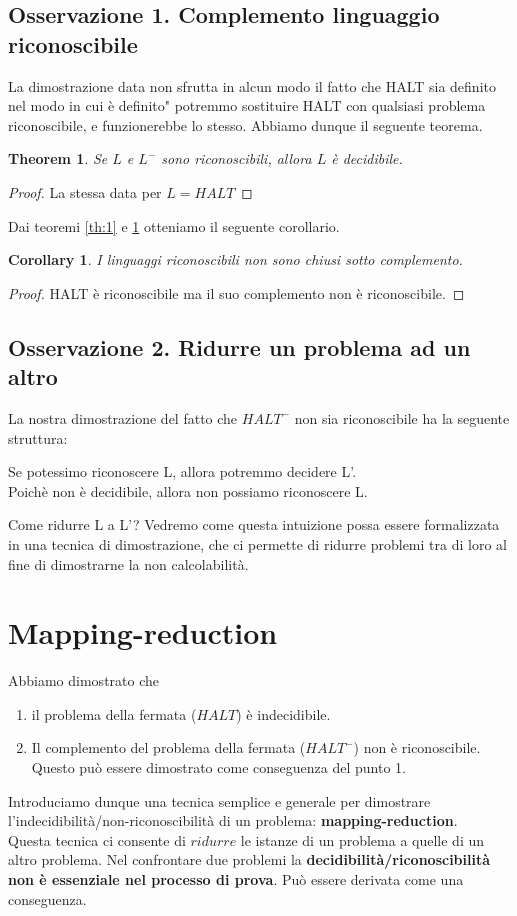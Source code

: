 \documentclass[a4paper, 12pt]{article}
\newtheorem{theorem}{Theorem}[section]
\newtheorem{corollary}{Corollary}[theorem]
\begin{document}
\subsection{Osservazione 1. Complemento linguaggio riconoscibile}
La dimostrazione data non sfrutta in alcun modo il fatto che HALT sia definito nel modo in cui \`e definito" potremmo sostituire HALT con qualsiasi problema riconoscibile, e funzionerebbe lo stesso. Abbiamo dunque il seguente teorema.
\begin{theorem}
\label{th:2}
Se $L$ e $L^{-}$ sono riconoscibili, allora $L$ \`e decidibile.
\end{theorem}
\begin{proof}
La stessa data per $L = HALT$
\end{proof}
Dai teoremi \ref{th:1} e \ref{th:2} otteniamo il seguente corollario.
\begin{corollary}
I linguaggi riconoscibili non sono chiusi sotto complemento.
\end{corollary}
\begin{proof}
HALT \`e riconoscibile ma il suo complemento non \`e riconoscibile.
\end{proof}
\subsection{Osservazione 2. Ridurre un problema ad un altro}
La nostra dimostrazione del fatto che $HALT^{-}$ non sia riconoscibile ha la seguente struttura:
\begin{center}
Se potessimo riconoscere L, allora potremmo decidere L'.\\ Poich\`e non \`e decidibile, allora non possiamo riconoscere L.
\end{center}
Come ridurre L a L'? Vedremo come questa intuizione possa essere formalizzata in una tecnica di dimostrazione, che ci permette di ridurre problemi tra di loro al fine di dimostrarne la non calcolabilit\`a.
\newpage
\section{Mapping-reduction}
Abbiamo dimostrato che 
\begin{enumerate}
\item il problema della fermata ($HALT$) \`e indecidibile.
\item Il complemento del problema della fermata ($HALT^{-}$) non \`e riconoscibile. Questo pu\`o essere dimostrato come conseguenza del punto 1.
\end{enumerate}
Introduciamo dunque una tecnica semplice e generale per dimostrare l'indecidibilit\`a/non-riconoscibilit\`a di un problema: \textbf{mapping-reduction}.\\
Questa tecnica ci consente di $ridurre$ le istanze di un problema a quelle di un altro problema. Nel confrontare due problemi la \textbf{decidibilit\`a/riconoscibilit\`a non \`e essenziale nel processo di prova}. Pu\`o essere derivata come una conseguenza.
\end{document}
